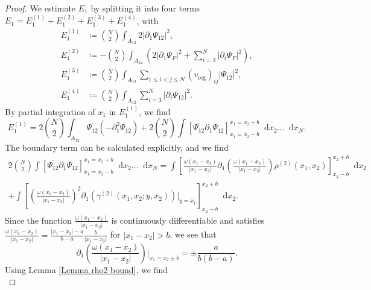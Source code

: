\documentclass[a4paper,11pt]{article}
\newcommand{\abs}[1]{\left\lvert #1 \right\rvert}
\newcommand*\diff{\mathop{}\!\mathrm{d}}
\numberwithin{equation}{section}
\begin{document}
		\begin{proof}
		We estimate $ E_1 $ by splitting it into four terms $ E_1=E_1^{(1)}+E_1^{(2)}+E_1^{(3)}+E_1^{(4)} $, with
  \begin{equation}
		\begin{aligned}
		E_1^{(1)}&\coloneqq \binom{N}{2}\int_{A_{12}}2\abs{\partial_1\Psi_{12}}^2,\\
        E_1^{(2)}&\coloneqq-\binom{N}{2}\int_{A_{12}}\left(2\abs{\partial_1\Psi_F}^2+\sum_{i=3}^{N}\abs{\partial_i\Psi_F}^2\right),\\
        E^{(3)}_1&\coloneqq\binom{N}{2}\int_{A_{12}} \sum_{1\leq i<j\leq N}(v_{\text{reg}})_{ij}\abs{\Psi_{12}}^2,\\
        E_1^{(4)}&\coloneqq\binom{N}{2}\int_{A_{12}}\sum_{i=3}^{N}\abs{\partial_i\Psi_{12}}^2.
		\end{aligned}
		\end{equation}
		By partial integration of $x_1$ in $E_1^{(1)}$, we find\begin{equation}
		    E_1^{(1)}=2\binom{N}{2}\int_{A_{12}}\overline{\Psi_{12}}\left( -\partial^2_1 \Psi_{12} \right)+2\binom{N}{2}\int\left[\overline{\Psi_{12}}\partial_1\Psi_{12}\right]_{x_1=x_2-b}^{x_1=x_2+b}\diff x_2\dots\diff x_N.
		\end{equation} 
        The boundary term can be calculated explicitly, and we find \begin{equation}
		\begin{aligned}
		2\binom{N}{2}\int\left[\overline{\Psi_{12}}\partial_1\Psi_{12}\right]_{x_1=x_2-b}^{x_1=x_2+b}\diff x_2\dots\diff x_N=\int\left[\frac{\omega(x_1-x_2)}{\abs{x_1-x_2}}\partial_{1}\left(\frac{\omega(x_1-x_2)}{\abs{x_1-x_2}}\right)\rho^{(2)}(x_1,x_2)\right]_{x_2-b}^{x_2+b}\diff x_2\\+\int\left[\left(\frac{\omega(x_1-x_2)}{\abs{x_1-x_2}}\right)^2\partial_{1}\left(\gamma^{(2)}(x_1,x_2;y,x_2)\right)\bigg\vert_{y=x_1}\right]_{x_2-b}^{x_2+b}\diff x_2.
		\end{aligned}
		\end{equation}
		Since the function $ \frac{\omega(x_1-x_2)}{\abs{x_1-x_2}} $ is continuously differentiable and satisfies $ \frac{\omega(x_1-x_2)}{\abs{x_1-x_2}}=\frac{\abs{x_1-x_2}-a}{b-a}\frac{b}{\abs{x_1-x_2}} $ for $ \abs{x_1-x_2}>b $, we see that \begin{equation}
		\partial_{1}\left(\frac{\omega(x_1-x_2)}{\abs{x_1-x_2}}\right)\bigg\vert_{x_1=x_2\pm b}=\pm\frac{a}{b(b-a)}.
		\end{equation}
		Using Lemma \ref{Lemma rho2 bound}, we find \begin{equation}

\end{equation}
\end{proof}
\end{document}
